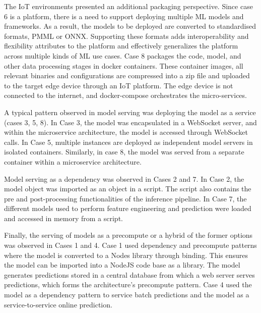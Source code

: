 The IoT environments presented an additional packaging perspective. Since case 6 is a platform, there is a need to support deploying multiple ML models and frameworks. As a result, the models to be deployed are converted to standardised formats, PMML or ONNX. Supporting these formats adds interoperability and flexibility attributes to the platform and effectively generalizes the platform across multiple kinds of ML use cases. Case 8 packages the code, model, and other data processing stages in docker containers. These container images, all relevant binaries and configurations are compressed into a zip file and uploaded to the target edge device through an IoT platform. The edge device is not connected to the internet, and docker-compose orchestrates the micro-services.


A typical pattern observed in model serving was deploying the model as a service (cases 3, 5, 8). In Case 3, the model was encapsulated in a WebSocket server, and within the microservice architecture, the model is accessed through WebSocket calls. In Case 5, multiple instances are deployed as independent model servers in isolated containers. Similarly, in case 8, the model was served from a separate container within a microservice architecture.

Model serving as a dependency was observed in Cases 2 and 7. In Case 2, the model object was imported as an object in a script. The script also contains the pre and post-processing functionalities of the inference pipeline. In Case 7, the different models used to perform feature engineering and prediction were loaded and accessed in memory from a script. 

Finally, the serving of models as a precompute or a hybrid of the former options was observed in Cases 1 and 4. Case 1 used dependency and precompute patterns where the model is converted to a  Nodes library through binding. This ensures the model can be imported into a NodeJS code base as a library. The model generates predictions stored in a central database from which a web server serves predictions, which forms the architecture's precompute pattern. Case 4 used the model as a dependency pattern to service batch predictions and the model as a service-to-service online prediction.

